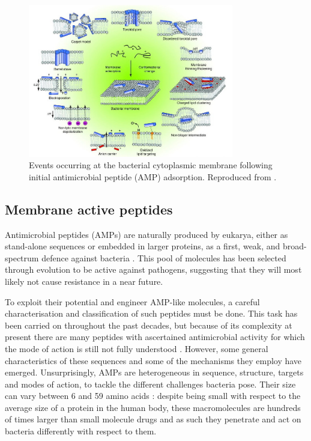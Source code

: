 \begin{figure}
\begin{center}
\includegraphics[width = 0.8\textwidth]{1introduction/pics/amp_mech.jpg}
\caption[Modes of action of antimicrobial peptides]{Events occurring at the bacterial cytoplasmic membrane following initial antimicrobial peptide (AMP) adsorption. Reproduced from \citet{Nguyen2011}.} \label{fig:amp}
\end{center}
\end{figure}


\subsection{Membrane active peptides} \label{sec:host-defense-peptides}
Antimicrobial peptides (AMPs) are naturally produced by eukarya, either as stand-alone sequences or embedded in larger proteins, as a first, weak, and broad-spectrum defence against bacteria \citep{Nguyen2011}.
%
This pool of molecules has been selected through evolution to be active against pathogens, suggesting that they will most likely not cause resistance in a near future.

To exploit their potential and engineer AMP-like molecules, a careful characterisation and classification of such peptides must be done. This task has been carried on throughout the past decades, but because of its complexity at present there are many peptides with ascertained antimicrobial activity for which the mode of action is still not fully understood \citep{Ebbensgaard2015}. However, some general characteristics of these sequences and some of the mechanisms they employ have emerged.
%
Unsurprisingly, AMPs are heterogeneous in  sequence, structure, targets and modes of action, to tackle the different challenges bacteria pose. Their size can vary between 6 and 59 amino acids \citep{Brogden2005}: despite being small with respect to the average size of a protein in the human body, these macromolecules are hundreds of times larger than small molecule drugs and as such they penetrate and act on bacteria differently with respect to them.

